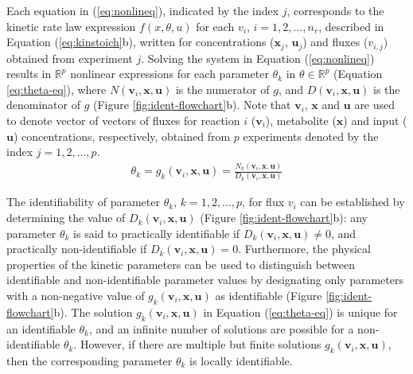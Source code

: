 \documentclass[10pt]{article}
\begin{document}
	Each equation in (\ref{eq:nonlineq}), indicated by the index $j$, corresponds to the kinetic rate law expression $f(x, \theta, u)$ for each $v_i$, $i={1, 2, ..., n_r}$, described in Equation (\ref{eq:kinstoich}b), written for concentrations ($\mathbf{x}_j$, $\mathbf{u}_j$) and fluxes ($v_{i,j}$) obtained from experiment $j$. Solving the system in Equation (\ref{eq:nonlineq}) results in $\mathbb{R}^p$ nonlinear expressions for each parameter $\theta_k$ in $\theta \in \mathbb{R}^p$ (Equation \ref{eq:theta-eq}), where $N(\mathbf{v}_i, \mathbf{x}, \mathbf{u})$ is the numerator of $g$, and $D(\mathbf{v}_i, \mathbf{x}, \mathbf{u})$ is the denominator of $g$ (Figure \ref{fig:ident-flowchart}b). Note that $\mathbf{v}_i$, $\mathbf{x}$ and $\mathbf{u}$ are used to denote vector of vectors of fluxes for reaction $i$ ($\mathbf{v}_i$), metabolite ($\mathbf{x}$) and input ($\mathbf{u}$) concentrations, respectively, obtained from $p$ experiments denoted by the index $j = {1, 2, ..., p}$.
	\begin{align}\label{eq:theta-eq}
	\theta_k = g_k(\mathbf{v}_i, \mathbf{x}, \mathbf{u}) = \frac{N_k(\mathbf{v}_i, \mathbf{x}, \mathbf{u})}{D_k(\mathbf{v}_i, \mathbf{x}, \mathbf{u})}
	\end{align}

	The identifiability of parameter $\theta_k$, $k = {1, 2, ..., p}$, for flux $v_i$ can be established by determining the value of $D_k(\mathbf{v}_i, \mathbf{x}, \mathbf{u})$ (Figure \ref{fig:ident-flowchart}b): any parameter $\theta_k$ is said to practically identifiable if $D_k(\mathbf{v}_i, \mathbf{x}, \mathbf{u})\neq0$, and practically non-identifiable if $D_k(\mathbf{v}_i, \mathbf{x}, \mathbf{u}) = 0$. Furthermore, the physical properties of the kinetic parameters can be used to distinguish between identifiable and non-identifiable parameter values by designating only parameters with a non-negative value of $g_k(\mathbf{v}_i, \mathbf{x}, \mathbf{u})$ as identifiable (Figure \ref{fig:ident-flowchart}b). The solution $g_k(\mathbf{v}_i, \mathbf{x}, \mathbf{u})$ in Equation (\ref{eq:theta-eq}) is unique for an identifiable $\theta_k$, and an infinite number of solutions are possible for a non-identifiable $\theta_k$. However, if there are multiple but finite solutions $g_k(\mathbf{v}_i, \mathbf{x}, \mathbf{u})$, then the corresponding parameter $\theta_k$ is locally identifiable.
	
	
\end{document}
